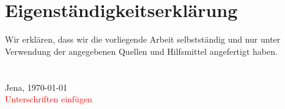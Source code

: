 \documentclass[12pt,a4paper]{report}
\newcommand{\todo}[1]{\textcolor{red}{#1}}
\begin{document}
    \section*{Eigenständigkeitserklärung}
        Wir erklären, dass wir die vorliegende Arbeit selbstständig und nur unter Verwendung der angegebenen Quellen und Hilfsmittel angefertigt haben.\\\\\\
        Jena, \today\\
        \todo{Unterschriften einfügen}
        \thispagestyle{empty}
        \pagebreak
        
    \tableofcontents 
    \clearpage
    
    
    
    
    
    
    
    
    
    
    
    
\end{document}
